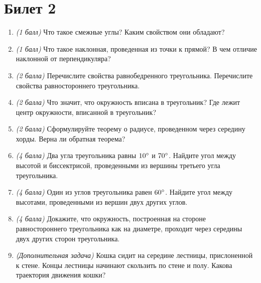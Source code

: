 \documentclass[12pt, a4paper]{article}
\begin{document}
\section*{Билет 2}
\begin{enumerate}
	\item \textit{(1 балл)} Что такое смежные углы? Каким свойством они обладают?
	\item \textit{(1 балл)} Что такое наклонная, проведенная из точки к прямой? В чем отличие наклонной от перпендикуляра?
	\item \textit{(2 балла)} Перечислите свойства равнобедренного треугольника. Перечислите свойства равностороннего треугольника.
	\item \textit{(2 балла)} Что значит, что окружность вписана в треугольник? Где лежит центр окружности, вписанной в треугольник?
	\item \textit{(2 балла)} Сформулируйте теорему о радиусе, проведенном через середину хорды. Верна ли обратная теорема?
	\item \textit{(4 балла)} Два угла треугольника равны $10\degree$ и $70\degree$. Найдите угол между высотой и биссектрисой, проведенными из вершины третьего угла треугольника.
	\item \textit{(4 балла)} Один из углов треугольника равен $60\degree$. Найдите угол между высотами, проведенными из вершин двух других углов.
	\item \textit{(4 балла)} Докажите, что окружность, построенная на стороне равностороннего треугольника как на диаметре, проходит через середины двух других сторон треугольника.
	\item \textit{(Дополнительная задача)} Кошка сидит на середине лестницы, прислоненной к стене. Концы лестницы начинают скользить по стене и полу. Какова траектория движения кошки?
\end{enumerate}
\end{document}
